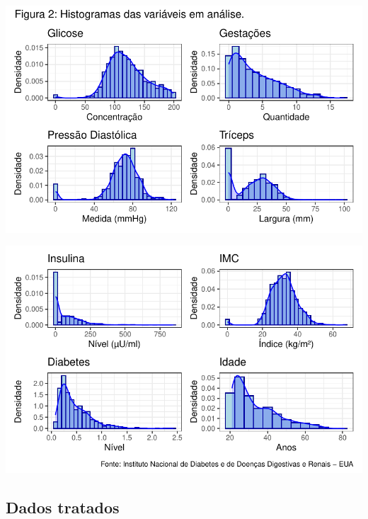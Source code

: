 \documentclass[
  letterpaper,
  DIV=11,
  numbers=noendperiod]{scrartcl}
\begin{document}
\includegraphics{relatorio_lab1_files/figure-pdf/unnamed-chunk-4-1.pdf}

\includegraphics{relatorio_lab1_files/figure-pdf/unnamed-chunk-4-2.pdf}

\hypertarget{dados-tratados}{%
\subsection{Dados tratados}\label{dados-tratados}}
\end{document}
